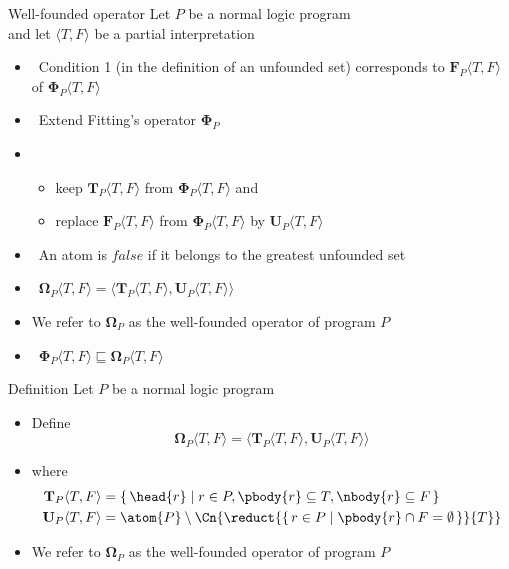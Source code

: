 \begin{frame}{Well-founded operator}
  Let $P$ be a normal logic program\\
  and let $\langle T,F \rangle$ be a partial interpretation
  \medskip
  \begin{itemize}
  \item<2->  \
    Condition 1 (in the definition of an unfounded set)
    corresponds to  ${\mathbf{F}}_P\langle T,F \rangle$
    of ${\mathbf{\Phi}}_P\langle T,F \rangle$
    \medskip
  \item<3->  \
    Extend Fitting's operator $\mathbf{\Phi}_P$
  \item<4-> []
    \begin{itemize}\normalsize
    \item keep    ${\mathbf{T}}_P\langle T,F \rangle$ from ${\mathbf{\Phi}}_P\langle T,F \rangle$ and
    \item replace ${\mathbf{F}}_P\langle T,F \rangle$ from ${\mathbf{\Phi}}_P\langle T,F \rangle$ by
      ${\mathbf{U}}_P\langle T,F \rangle$
    \end{itemize}
    \medskip
  \item<only@5 >  \ An atom is $\mathit{false}$ if it belongs to the greatest unfounded set
  \item<only@7->  \
    \(
    {\mathbf{\Omega}}_P\langle T,F \rangle
    =
    \langle {\mathbf{T}}_P\langle T,F \rangle, {\mathbf{U}}_P\langle T,F \rangle\rangle
    \)
  \item<only@8->[] We refer to ${\mathbf{\Omega}}_P$ as the \alert{well-founded operator} of program $P$
    \smallskip
  \item<only@9->  \
    \(
    {\mathbf{\Phi}}_P  \langle T,F \rangle
    \sqsubseteq
    {\mathbf{\Omega}}_P\langle T,F \rangle
    \)
  \end{itemize}
\end{frame}
\begin{frame}{Definition}
  \bigskip
  Let $P$ be a normal logic program
  \medskip
  \begin{itemize}
  \item Define
    \[
      {\mathbf{\Omega}}_P\langle T,F \rangle
      =
      \langle
      {\mathbf{T}}_P\langle T,F \rangle,
      {\mathbf{U}}_P\langle T,F \rangle
      \rangle
    \]
  \item []
    where
    \begin{align*}
      {\mathbf{T}}_P\langle T,F \rangle
      & =
      \{\, \head{r} \mid r \in P, \pbody{r} \subseteq T, \nbody{r} \subseteq F \,\}
      \\
      {\mathbf{U}}_P\langle T,F \rangle
      & =
      \atom{P} \setminus
      \Cn{\reduct{\{\,r \in P \mid \pbody{r} \cap F = \emptyset\,\}}{T}}
    \end{align*}
\item We refer to ${\mathbf{\Omega}}_P$ as the \alert{well-founded operator} of program $P$
\end{itemize}
\end{frame}
